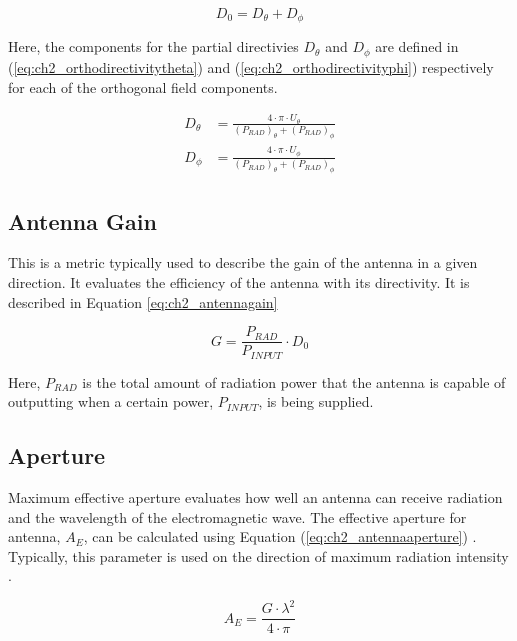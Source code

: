 \begin{equation}
    \label{eq:ch2_orthodirectivity}
    D_{0}=D_{\theta}+D_{\phi}
\end{equation}

\par Here, the components for the partial directivies $D_{\theta}$ and $D_{\phi}$ are defined in (\ref{eq:ch2_orthodirectivitytheta}) and (\ref{eq:ch2_orthodirectivityphi}) respectively for each of the orthogonal field components.

\begin{align}
    D_{\theta} &= \frac{4\cdot\pi\cdot  U_{\theta}}{(P_{RAD})_{\theta}+(P_{RAD})_{\phi}}
    \label{eq:ch2_orthodirectivitytheta} \\
    D_{\phi} &= \frac{4\cdot\pi\cdot  U_{\phi}}{(P_{RAD})_{\theta}+(P_{RAD})_{\phi}}
    \label{eq:ch2_orthodirectivityphi}
\end{align}

\subsection{Antenna Gain}
This is a metric typically used to describe the gain of the antenna in a given direction. It evaluates the efficiency of the antenna with its directivity. It is described in Equation \ref{eq:ch2_antennagain}

\begin{equation}
    \label{eq:ch2_antennagain}
    G =  \frac{P_{RAD}}{P_{INPUT}}\cdot D_{0}
\end{equation}

\par Here, $P_{RAD}$ is the total amount of radiation power that the antenna is capable of outputting when a certain power, $P_{INPUT}$, is being supplied.

\subsection{Aperture}
\par Maximum effective aperture evaluates how well an antenna can receive radiation and the wavelength of the electromagnetic wave. The effective aperture for antenna, $A_{E}$, can be calculated using Equation (\ref{eq:ch2_antennaaperture}) \cite{Delos2020PhasedFactor}. Typically, this parameter is used on the direction of maximum radiation intensity \cite{ConstantineA.Balanis2016AntennaDesign}.

\begin{equation}
    \label{eq:ch2_antennaaperture}
    A_{E} = \frac{G\cdot \lambda^{2}}{4\cdot\pi}
\end{equation}


